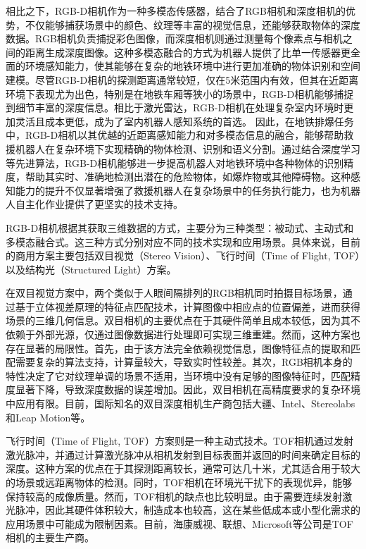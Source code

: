 相比之下，RGB-D相机作为一种多模态传感器，结合了RGB相机和深度相机的优势，不仅能够捕获场景中的颜色、纹理等丰富的视觉信息，还能够获取物体的深度数据。RGB相机负责捕捉彩色图像，而深度相机则通过测量每个像素点与相机之间的距离生成深度图像。这种多模态融合的方式为机器人提供了比单一传感器更全面的环境感知能力，使其能够在复杂的地铁环境中进行更加准确的物体识别和空间建模。尽管RGB-D相机的探测距离通常较短，仅在5米范围内有效，但其在近距离环境下表现尤为出色，特别是在地铁车厢等狭小的场景中，RGB-D相机能够捕捉到细节丰富的深度信息。相比于激光雷达，RGB-D相机在处理复杂室内环境时更加灵活且成本更低，成为了室内机器人感知系统的首选。
因此，在地铁排爆任务中，RGB-D相机以其优越的近距离感知能力和对多模态信息的融合，能够帮助救援机器人在复杂环境下实现精确的物体检测、识别和语义分割。通过结合深度学习等先进算法，RGB-D相机能够进一步提高机器人对地铁环境中各种物体的识别精度，帮助其实时、准确地检测出潜在的危险物体，如爆炸物或其他障碍物。这种感知能力的提升不仅显著增强了救援机器人在复杂场景中的任务执行能力，也为机器人自主化作业提供了更坚实的技术支持。


RGB-D相机根据其获取三维数据的方式，主要分为三种类型：被动式、主动式和多模态融合式。这三种方式分别对应不同的技术实现和应用场景。具体来说，目前的商用方案主要包括双目视觉（Stereo Vision）、飞行时间（Time of  Flight, TOF）以及结构光（Structured Light）方案。

在双目视觉方案中，两个类似于人眼间隔排列的RGB相机同时拍摄目标场景，通过基于立体视差原理的特征点匹配技术，计算图像中相应点的位置偏差，进而获得场景的三维几何信息。双目相机的主要优点在于其硬件简单且成本较低，因为其不依赖于外部光源，仅通过图像数据进行处理即可实现三维重建。然而，这种方案也存在显著的局限性。首先，由于该方法完全依赖视觉信息，图像特征点的提取和匹配需要复杂的算法支持，计算量较大，导致实时性较差。其次，RGB相机本身的特性决定了它对纹理单调的场景不适用，当环境中没有足够的图像特征时，匹配精度显著下降，导致深度数据的误差增加​。因此，双目相机在高精度要求的复杂环境中应用有限。目前，国际知名的双目深度相机生产商包括大疆、Intel、Stereolabs和Leap Motion等。

飞行时间（Time of  Flight, TOF）方案则是一种主动式技术。TOF相机通过发射激光脉冲，并通过计算激光脉冲从相机发射到目标表面并返回的时间来确定目标的深度。这种方案的优点在于其探测距离较长，通常可达几十米，尤其适合用于较大的场景或远距离物体的检测。同时，TOF相机在环境光干扰下的表现优异，能够保持较高的成像质量。然而，TOF相机的缺点也比较明显。由于需要连续发射激光脉冲，因此其硬件体积较大，制造成本也较高，这在某些低成本或小型化需求的应用场景中可能成为限制因素。目前，海康威视、联想、Microsoft等公司是TOF相机的主要生产商。

